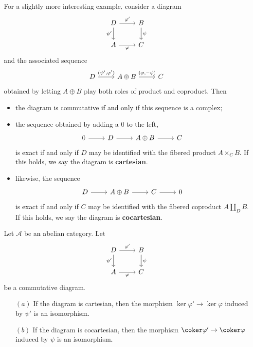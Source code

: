 \begin{example}\label{fibered diagram}
For a slightly more interesting example, consider a diagram
\[\begin{tikzcd}
D\ar[d,swap,"\psi'"]\ar[r,"\varphi'"]&B\ar[d,"\psi"]\\
A\ar[r,swap,"\varphi"]&C
\end{tikzcd}\]
and the associated sequence
\[\begin{tikzcd}
D\ar[r,"{(\psi',\varphi')}"]&A\oplus B\ar[r,"{(\varphi,-\psi)}"]&C
\end{tikzcd}\]
obtained by letting $A\oplus B$ play both roles of product and coproduct. Then
\begin{itemize}
\item the diagram is commutative if and only if this sequence is a complex;
\item the sequence obtained by adding a $0$ to the left,
\[\begin{tikzcd}
0\ar[r]&D\ar[r]&A\oplus B\ar[r]&C
\end{tikzcd}\]
is exact if and only if $D$ may be identified with the fibered product $A\times_{C}B$. If this holds, we say the diagram is \textbf{cartesian}.
\item likewise, the sequence
\[\begin{tikzcd}
D\ar[r]&A\oplus B\ar[r]&C\ar[r]&0
\end{tikzcd}\]
is exact if and only if $C$ may be identified with the fibered coproduct $A\amalg_DB$. If this holds, we say the diagram is \textbf{cocartesian}.
\end{itemize}
\end{example}
\begin{lemma}\label{pull bak lem}
Let $\mathcal{A}$ be an abelian category. Let
\[\begin{tikzcd}
D\ar[d,swap,"\psi'"]\ar[r,"\varphi'"]&B\ar[d,"\psi"]\\
A\ar[r,swap,"\varphi"]&C
\end{tikzcd}\]
be a commutative diagram.
\begin{itemize}
\item[$(a)$] If the diagram is cartesian, then the morphism $\ker\varphi'\to\ker\varphi$ induced by $\psi'$ is an isomorphism.
\item[$(b)$] If the diagram is cocartesian, then the morphism $\coker\varphi'\to\coker\varphi$ induced by $\psi$ is an isomorphism.
\end{itemize}
\end{lemma}
